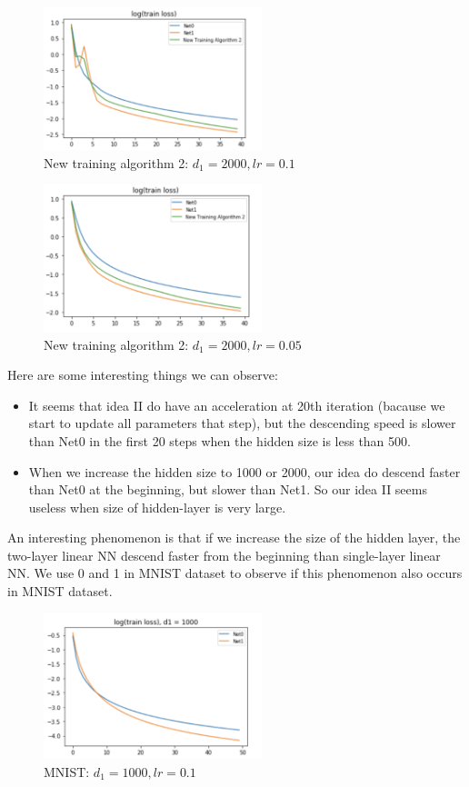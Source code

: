 \begin{figure}[H]
	\centering
	\includegraphics[width=2.5in]{figure/train2_hidden2000_lr1.png}
	\caption{New training algorithm 2: $d_1 = 2000, lr = 0.1$}
\end{figure}
\begin{figure}[H]
	\centering
	\includegraphics[width=2.5in]{figure/train2_hidden2000_lr05.png}
	\caption{New training algorithm 2: $d_1 = 2000, lr = 0.05$}
\end{figure}

Here are some interesting things we can observe:
\begin{itemize}
	\item It seems that idea II do have an acceleration at 20th iteration (bacause we start to update all parameters that step), but the descending speed is slower than Net0 in the first 20 steps when the hidden size is less than 500.
	\item When we increase the hidden size to 1000 or 2000, our idea do descend faster than Net0 at the beginning, but slower than Net1. So our idea II seems useless when size of hidden-layer is very large.

	
\end{itemize}

An interesting phenomenon is that if we increase the size of the hidden layer, the two-layer linear NN descend faster from the beginning than single-layer linear NN. We use 0 and 1 in MNIST dataset to observe if this phenomenon also occurs in MNIST dataset.

\begin{figure}[H]
	\centering
	\includegraphics[width=2.5in]{figure/MNIST_hidden1000_step50.png}
	\caption{MNIST: $d_1 = 1000, lr = 0.1$}
\end{figure}


